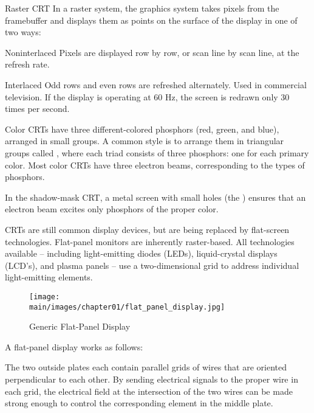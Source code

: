 \documentclass[../COS3712_Notes.tex]{subfiles}
\begin{document}
        \begin{definition}{Raster CRT}
          In a raster system, the graphics system takes pixels from the framebuffer and
          displays them as points on the surface of the display in one of two ways:
          \begin{descriptimize}[nosep]
            \item[Noninterlaced] Pixels are displayed row by row,
            or scan line by scan line, at the refresh rate.
            \item[Interlaced] Odd rows and even rows are refreshed alternately.
            Used in commercial television.
            If the display is operating at 60 Hz, the screen is redrawn only 30 times per second.
          \end{descriptimize}
        \end{definition}

        Color CRTs have three different-colored phosphors (red, green, and blue),
        arranged in small groups.
        A common style is to arrange them in triangular groups called ,
        where each triad consists of three phosphors: one for each primary color.
        Most color CRTs have three electron beams, corresponding to the types of phosphors.

        In the shadow-mask CRT, a metal screen with small holes (the )
        ensures that an electron beam excites only phosphors of the proper color.

        CRTs are still common display devices, but are being replaced by flat-screen technologies.
        Flat-panel monitors are inherently raster-based.
        All technologies available -- including light-emitting diodes (LEDs),
        liquid-crystal displays (LCD's), and plasma panels --
        use a two-dimensional grid to address individual light-emitting elements.
        \pagebreak

        \begin{wrapfigure}{l}{0.5\textwidth}
          \begin{center}
            \texttt{[image: \\main/images/chapter01/flat\_panel\_display.jpg]}
          \end{center}
          \caption{Generic Flat-Panel Display}
        \end{wrapfigure}

        A flat-panel display works as follows:

        The two outside plates each contain parallel grids of wires that are oriented perpendicular
        to each other.
        By sending electrical signals to the proper wire in each grid,
        the electrical field at the intersection of the two wires
        can be made strong enough to control the corresponding element in the middle plate.
\end{document}
